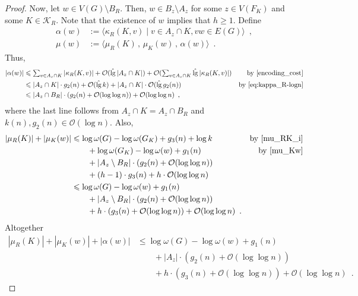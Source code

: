 \documentclass{patmorin}
\let\eqref\cref
\renewcommand{\le}{\leqslant}
\renewcommand{\geq}{\geqslant}
\renewcommand{\leq}{\leqslant}
\DeclareMathOperator{\lgg}{\hat{lg}}
\newcommand{\Oh}{\mathcal{O}}
\begin{document}
\begin{proof}
    Now, let $w\in V(G)\setminus B_R$.
    Then, $w\in B_z\setminus A_z$ for some $z\in V(F_K)$ and some $K\in\mathcal{K}_R$.
    Note that the existence of $w$ implies that $h\geq 1$.
    Define
    \begin{align*}
        \alpha(w)&:=\langle\kappa_R(K,v)\mid v\in A_z\cap K, vw\in E(G)\rangle\enspace,\\
        \mu(w) &:= \langle\mu_R(K)\,,\, \mu_K(w)\,,\, \alpha(w) \rangle \enspace .
    \end{align*}
    Thus,  
    \begin{align*}
        |\alpha(w)|
        &\leq \textstyle\sum_{v\in A_z\cap K} |\kappa_R(K,v)| +
        \Oh(\lgg|A_z\cap K|) + \Oh(\sum_{v\in A_z\cap K} \lgg |\kappa_R(K,v)|)
        &\textrm{by~\eqref{encoding_cost}}\\
        &\leq |A_z\cap K|\cdot g_2(n) +
        \Oh(\lgg k) + |A_z\cap K|\cdot\Oh(\lgg g_2(n))
        &\textrm{by~\eqref{eq:kappa_R-logn}}\\
        &\leq |A_z\cap B_R|\cdot (g_2(n) +\Oh(\log\log n)) + \Oh(\log\log n)\enspace,
    \end{align*}
    where the last line follows
    from $A_z\cap K= A_z\cap B_R$ and $k(n),g_2(n)\in\Oh(\log n)$.
    Also, 
    \begin{align*}
       |\mu_R(K)|+|\mu_K(w)|
       & \le \log \omega(G) - \log\omega(G_K) + g_3(n) + \log k & \text{by~\eqref{mu_RK_i}}\\
       & \qquad {} + \log\omega(G_K) - \log\omega(w) + g_1(n) & \text{by~\eqref{mu_Kw}}\\
       & \qquad {} + |A_z\setminus B_R|\cdot (g_2(n) + \Oh(\log\log n))\\
       & \qquad {} + (h-1)\cdot g_3(n) + h\cdot\Oh(\log\log n)\\
       & \leq \log\omega(G) - \log\omega(w) + g_1(n)\\
       & \qquad {} + |A_z\setminus B_R|\cdot (g_2(n) + \Oh(\log\log n))\\
       & \qquad {} + h\cdot (g_3(n) + \Oh(\log\log n)) + \Oh(\log\log n) \enspace . \notag
    \end{align*}
    Altogether
    \begin{align*}
      |\mu_R(K)|+|\mu_K(w)|+|\alpha(w)|
        & \le \log \omega(G) - \log\omega(w) + g_1(n)\\
        & \qquad {} + |A_z|\cdot (g_2(n)+\Oh(\log\log n))\\
        & \qquad {} + h\cdot (g_3(n) + \Oh(\log\log n)) + \Oh(\log\log n)\enspace.

\end{align*}
\end{proof}
\end{document}
